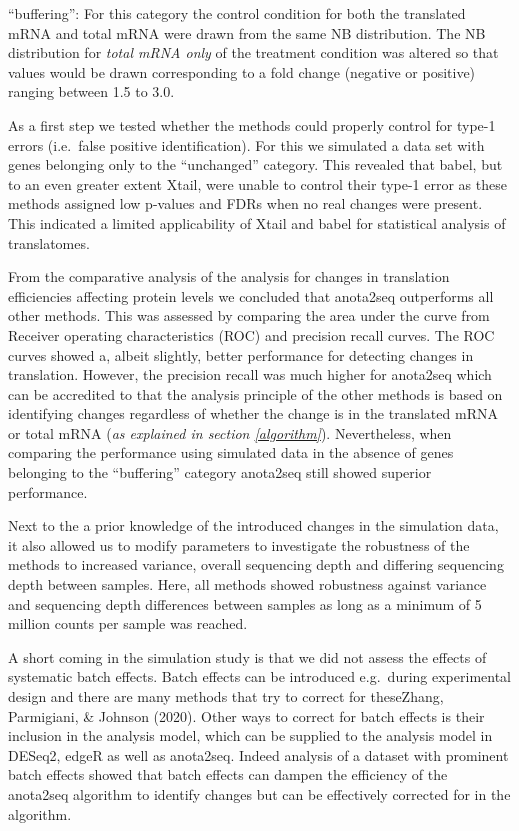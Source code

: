 \documentclass[
  12pt,
  openany]{book}
\begin{document}
``buffering'': For this category the control condition for both the translated mRNA and total mRNA were drawn from the same NB distribution. The NB distribution for \emph{total mRNA only} of the treatment condition was altered so that values would be drawn corresponding to a fold change (negative or positive) ranging between 1.5 to 3.0.

As a first step we tested whether the methods could properly control for type-1 errors (i.e.~false positive identification). For this we simulated a data set with genes belonging only to the ``unchanged'' category. This revealed that babel, but to an even greater extent Xtail, were unable to control their type-1 error as these methods assigned low p-values and FDRs when no real changes were present. This indicated a limited applicability of Xtail and babel for statistical analysis of translatomes.

From the comparative analysis of the analysis for changes in translation efficiencies affecting protein levels we concluded that anota2seq outperforms all other methods. This was assessed by comparing the area under the curve from Receiver operating characteristics (ROC) and precision recall curves. The ROC curves showed a, albeit slightly, better performance for detecting changes in translation. However, the precision recall was much higher for anota2seq which can be accredited to that the analysis principle of the other methods is based on identifying changes regardless of whether the change is in the translated mRNA or total mRNA (\emph{as explained in section \ref{algorithm}}). Nevertheless, when comparing the performance using simulated data in the absence of genes belonging to the ``buffering'' category anota2seq still showed superior performance.

Next to the a prior knowledge of the introduced changes in the simulation data, it also allowed us to modify parameters to investigate the robustness of the methods to increased variance, overall sequencing depth and differing sequencing depth between samples. Here, all methods showed robustness against variance and sequencing depth differences between samples as long as a minimum of 5 million counts per sample was reached.

A short coming in the simulation study is that we did not assess the effects of systematic batch effects. Batch effects can be introduced e.g.~during experimental design and there are many methods that try to correct for theseZhang, Parmigiani, \& Johnson (2020). Other ways to correct for batch effects is their inclusion in the analysis model, which can be supplied to the analysis model in DESeq2, edgeR as well as anota2seq. Indeed analysis of a dataset with prominent batch effects showed that batch effects can dampen the efficiency of the anota2seq algorithm to identify changes but can be effectively corrected for in the algorithm.
\end{document}
